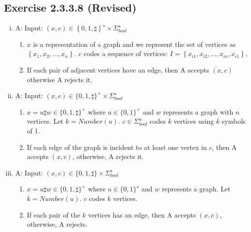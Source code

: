 \documentclass[twocolumn]{article}
\begin{document}
	\subsection*{Exercise 2.3.3.8 (Revised)}
	\begin{enumerate}[(i)]
	\item A: Input: $(x,c)\in \left\{
		0,1,\sharp\right\}^\star\times \Sigma^\star_{bool}$
		\begin{enumerate}[(1)]
			\item 
			$x$ is a representation of a graph and we represent the set of vertices as $\left\{x_1,x_2,\dots,x_n\right\}$. $c$ codes a sequence of vertices: $I=\left\{x_{i1},x_{i2},\dots,x_{in},x_{i1}\right\}$.
			\item  If each pair of adjacent vertices have an edge, then A accepts $(x,c)$ otherwise A rejects it. 
		\end{enumerate}
		\item 
		A: Input: $(x,c)\in \{0,1,\sharp\}^+\times \Sigma_{bool}^{\star}$
		\begin{enumerate}[(1)]
			\item 
			$x=u\sharp w\in\{0,1,\sharp\}^+$ where $u\in\{0,1\}^+$ and $w$ represents a graph with $n$ vertices. Let $k=Number(u)$. $c\in \Sigma_{bool}^n$ codes $k$ vertices using $k$ symbols of 1.
			\item 
			 If each edge of the graph is incident to at least one vertex in $c$, then A accepts $(x,c)$, otherwise, A rejects it. 
		\end{enumerate}
		\item 
		A: Input: $(x,c)\in\{0,1,\sharp\}\times \Sigma_{bool}^\star$
		\begin{enumerate}[(1)]
			\item 
			$x=u\sharp w\in\{0,1,\sharp\}^+$ where $u\in\{0,1\}^\star$ and $w$ represents a graph. Let $k=Number(u)$. $c$ codes $k$ vertices.
			\item 
			 If each pair of the $k$ vertices has an edge, then A accepts $(x,c)$, otherwise, A rejects. 
		\end{enumerate}
	\end{enumerate}
\end{document}

